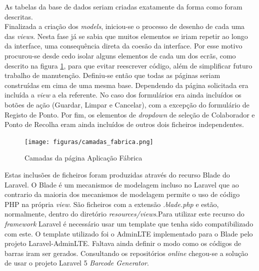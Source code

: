 \noindent
As tabelas da base de dados seriam criadas exatamente da forma como foram descritas.\\
Finalizada a criação dos \textit{models}, iniciou-se o processo de desenho de cada uma das \textit{views}. Nesta fase já se sabia que muitos elementos se iriam repetir ao longo da interface, uma consequência direta da coesão da interface. Por esse motivo procurou-se desde cedo isolar alguns elementos de cada um dos ecrãs, como descrito na figura \ref{fig:ui_fabrica_camadas}, para que evitar reescrever código, além de simplificar futuro trabalho de manutenção. Definiu-se então que todas as páginas seriam construídas em cima de uma mesma base. Dependendo da página solicitada era incluída a \textit{view} a ela referente. No caso dos formulários era ainda incluídos os botões de ação (Guardar, Limpar e Cancelar), com a excepção do formulário de Registo de Ponto. Por fim, os elementos de \textit{dropdown} de seleção de Colaborador e Ponto de Recolha eram ainda incluídos de outros dois ficheiros independentes. 
\begin{figure}[htbp] 
	\begin{center}
		\texttt{[image: figuras/camadas\_fabrica.png]}
		\caption{Camadas da página Aplicação Fábrica}
		\label{fig:ui_fabrica_camadas} 
	\end{center}
\end{figure}

\noindent
Estas inclusões de ficheiros foram produzidas através do recurso Blade do Laravel. O Blade é um mecanismos de modelagem incluso no Laravel que ao contrario da maioria dos mecanismos de modelagem permite o uso de código PHP na própria \textit{view}. São ficheiros com a extensão \textit{.blade.php} e estão, normalmente, dentro do diretório \textit{resources/views}\cite{Laravela}.Para utilizar este recurso do \textit{framework} Laravel é necessário usar um template que tenha sido compatibilizado com este. O template utilizado foi o AdminLTE\cite{AlmsaeedStudio} implementado para o Blade pelo projeto Laravel-AdminLTE\cite{Noten}. 
Faltava ainda definir o modo como os códigos de barras iram ser gerados. Consultando os repositórios \textit{online} chegou-se a solução de usar o projeto Laravel 5 \textit{Barcode Generator}\cite{Milon}.

